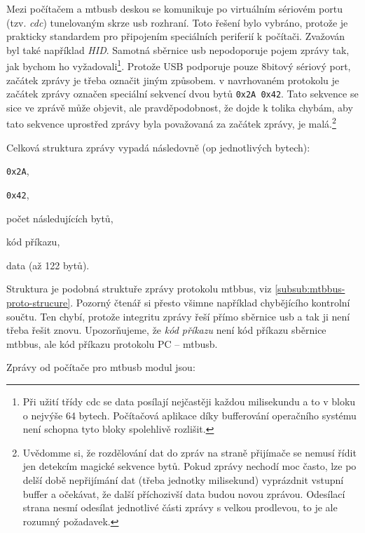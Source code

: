 Mezi počítačem a \gls{mtbusb} deskou se komunikuje po virtuálním sériovém portu
(tzv. \textit{\gls{cdc}}) tunelovaným skrze \gls{usb} rozhraní. Toto řešení bylo vybráno,
protože je prakticky standardem pro připojením speciálních periferií k počítači.
Zvažován byl také například \textit{HID}. Samotná sběrnice \gls{usb}
nepodoporuje pojem zprávy tak, jak bychom ho vyžadovali\footnote{Při užití třídy \gls{cdc}
se data posílají nejčastěji každou milisekundu a to v bloku o nejvýše 64 bytech.
Počítačová aplikace díky bufferování operačního systému není schopna tyto bloky
spolehlivě rozlišit.}. Protože USB podporuje pouze 8bitový sériový port, začátek
zprávy je třeba označit jiným způsobem. v navrhovaném protokolu je začátek zprávy
označen speciální sekvencí dvou bytů \texttt{0x2A 0x42}. Tato sekvence se sice
ve zprávě může objevit, ale pravděpodobnost, že dojde k tolika chybám, aby
tato sekvence uprostřed zprávy byla považovaná za začátek zprávy, je
malá.\footnote{Uvědomme si, že rozdělování dat do zpráv na straně přijímače
se nemusí řídit jen detekcím magické sekvence bytů. Pokud zprávy nechodí moc
často, lze po delší době nepřijímání dat (třeba jednotky milisekund) vyprázdnit
vstupní buffer a očekávat, že další příchozivší data budou novou zprávou. Odesílací
strana nesmí odesílat jednotlivé části zprávy s velkou prodlevou, to je ale
rozumný požadavek.}

Celková struktura zprávy vypadá následovně (op jednotlivých bytech):

\begin{compactenum}
\item \texttt{0x2A},
\item \texttt{0x42},
\item počet následujících bytů,
\item kód příkazu,
\item data (až 122 bytů).
\end{compactenum}

Struktura je podobná struktuře zprávy protokolu \gls{mtbbus}, viz
\ref{subsub:mtbbus-proto-strucure}. Pozorný čtenář si přesto všimne například
chybějícího kontrolní součtu. Ten chybí, protože integritu zprávy řeší přímo
sběrnice \gls{usb} a tak ji není třeba řešit znovu. Upozorňujeme, že
\textit{kód příkazu} není kód příkazu sběrnice \gls{mtbbus}, ale kód příkazu
protokolu PC – \gls{mtbusb}.

Zprávy od počítače pro \gls{mtbusb} modul jsou:

